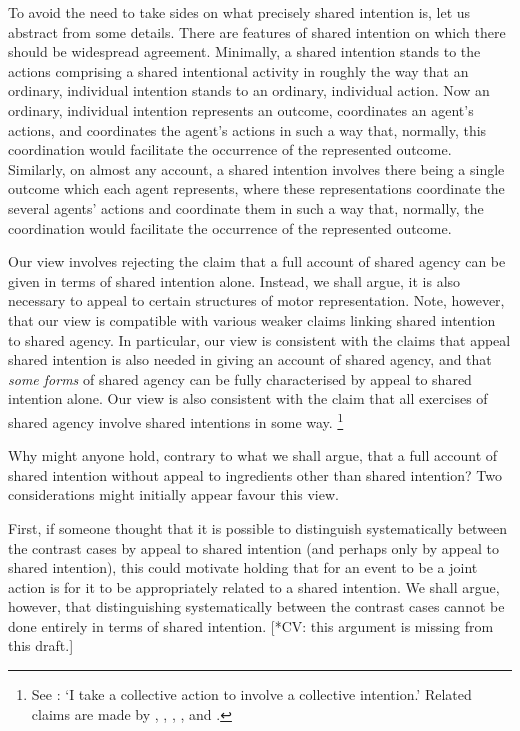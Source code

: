 \documentclass[12pt,\papersize]{extarticle}
\begin{document}
To avoid the need to take sides on what precisely shared intention is, 
let us abstract from some details. 
There are features of shared intention on which there should be widespread agreement.
Minimally, a shared intention stands to the actions comprising a shared intentional activity in roughly the way that an ordinary, individual intention stands to an ordinary, individual action.
Now an ordinary, individual intention represents an outcome, coordinates an agent's actions, and coordinates the agent's actions in such a way that, normally, this coordination would facilitate the occurrence of the represented outcome.
Similarly, 
on almost any account,
a shared intention involves there being a single outcome which each agent represents, where these representations coordinate the several agents' actions and coordinate them in such a way that, normally, the coordination would facilitate the occurrence of the represented outcome.

Our view involves rejecting the claim that a full account of shared agency can be given in terms of shared intention alone.
Instead, we shall argue, it is also necessary to appeal to certain structures of motor representation. 
Note, however, that our view is compatible with various weaker claims linking shared intention to shared agency.
In particular, our view is consistent with the claims that appeal shared intention is also needed in giving an account of shared agency, 
and that \emph{some forms} of shared agency can be fully characterised by appeal to shared intention alone.
Our view is also consistent with the claim that all exercises of shared agency involve shared intentions in some way.%
\footnote{
See \citet[p.\ 5]{Gilbert:2006wr}: `I take a collective action to involve a collective intention.'  
Related claims are made by 
	\citet[p.\ 381]{Carpenter:2009wq}, 
	\citet[p.\ 369]{Call:2009fk}, 
	\citet{Kutz:2000si},  
	\citet[p.\ 117]{rakoczy_pretend_2006},  and
	\citet{Tollefsen:2005vh}.
}

Why might anyone hold, contrary to what we shall argue, that a full account of shared intention without appeal to ingredients other than shared intention? 
Two considerations might initially appear favour this view.

First, if someone thought that it is possible to distinguish systematically between the contrast cases by appeal to shared intention (and perhaps only by appeal to shared intention), this could motivate holding that for an event to be a joint action is for it to be appropriately related to a shared intention.
We shall argue, however, that distinguishing systematically between the contrast cases cannot be done entirely in terms of shared intention. 
[*CV: this argument is missing from this draft.]
\end{document}
